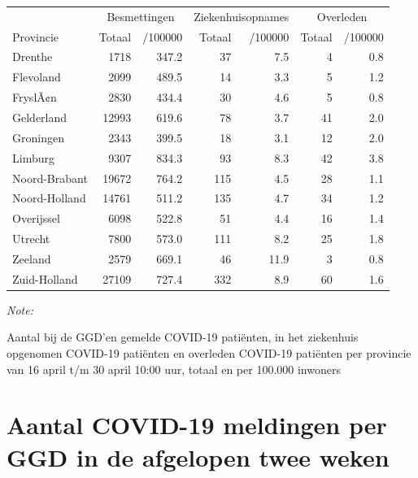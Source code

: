 \documentclass[
  english,
  man,floatsintext]{apa6}
\begin{document}
\begin{table}
\centering
\begin{threeparttable}
\begin{tabular}{lrrrrrr}
\toprule
\multicolumn{1}{c}{ } & \multicolumn{2}{c}{Besmettingen} & \multicolumn{2}{c}{Ziekenhuisopnames} & \multicolumn{2}{c}{Overleden} \\
\cmidrule(l{3pt}r{3pt}){2-3} \cmidrule(l{3pt}r{3pt}){4-5} \cmidrule(l{3pt}r{3pt}){6-7}
Provincie & Totaal & /100000 & Totaal & /100000 & Totaal & /100000\\
\midrule
Drenthe & 1718 & 347.2 & 37 & 7.5 & 4 & 0.8\\
Flevoland & 2099 & 489.5 & 14 & 3.3 & 5 & 1.2\\
FryslÃ¢n & 2830 & 434.4 & 30 & 4.6 & 5 & 0.8\\
Gelderland & 12993 & 619.6 & 78 & 3.7 & 41 & 2.0\\
Groningen & 2343 & 399.5 & 18 & 3.1 & 12 & 2.0\\
Limburg & 9307 & 834.3 & 93 & 8.3 & 42 & 3.8\\
Noord-Brabant & 19672 & 764.2 & 115 & 4.5 & 28 & 1.1\\
Noord-Holland & 14761 & 511.2 & 135 & 4.7 & 34 & 1.2\\
Overijssel & 6098 & 522.8 & 51 & 4.4 & 16 & 1.4\\
Utrecht & 7800 & 573.0 & 111 & 8.2 & 25 & 1.8\\
Zeeland & 2579 & 669.1 & 46 & 11.9 & 3 & 0.8\\
Zuid-Holland & 27109 & 727.4 & 332 & 8.9 & 60 & 1.6\\
\bottomrule
\end{tabular}
\begin{tablenotes}
\item \textit{Note: } 
\item Aantal bij de GGD’en gemelde COVID-19 patiënten, in het ziekenhuis opgenomen COVID-19 patiënten en overleden COVID-19 patiënten per provincie van 16 april t/m 30 april 10:00 uur, totaal en per 100.000 inwoners
\end{tablenotes}
\end{threeparttable}
\end{table}

\newpage

\hypertarget{aantal-covid-19-meldingen-per-ggd-in-de-afgelopen-twee-weken}{%
\section{Aantal COVID-19 meldingen per GGD in de afgelopen twee weken}\label{aantal-covid-19-meldingen-per-ggd-in-de-afgelopen-twee-weken}}
\end{document}
